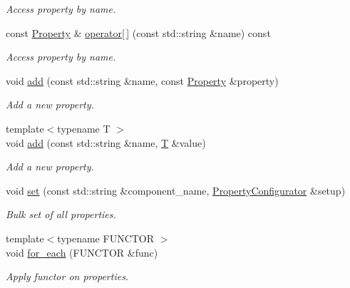 \begin{DoxyCompactItemize}
\begin{DoxyCompactList}\small\item\em Access property by name. \item\end{DoxyCompactList}\item 
const \hyperlink{class_d_d4hep_1_1_property}{Property} \& \hyperlink{class_d_d4hep_1_1_property_manager_adcb0b79db1b2b16883ad5758b5869824}{operator\mbox{[}$\,$\mbox{]}} (const std::string \&name) const 
\begin{DoxyCompactList}\small\item\em Access property by name. \item\end{DoxyCompactList}\item 
void \hyperlink{class_d_d4hep_1_1_property_manager_a616e3114076118659daddb1dc826a3ed}{add} (const std::string \&name, const \hyperlink{class_d_d4hep_1_1_property}{Property} \&property)
\begin{DoxyCompactList}\small\item\em Add a new property. \item\end{DoxyCompactList}\item 
{\footnotesize template$<$typename T $>$ }\\void \hyperlink{class_d_d4hep_1_1_property_manager_a7c6b9ce5ed0c66ff6018b3ab1aad183a}{add} (const std::string \&name, \hyperlink{class_t}{T} \&value)
\begin{DoxyCompactList}\small\item\em Add a new property. \item\end{DoxyCompactList}\item 
void \hyperlink{class_d_d4hep_1_1_property_manager_a96ebaf0f57064e8fa2f00a42c360ddf8}{set} (const std::string \&component\_\-name, \hyperlink{class_d_d4hep_1_1_property_configurator}{PropertyConfigurator} \&setup)
\begin{DoxyCompactList}\small\item\em Bulk set of all properties. \item\end{DoxyCompactList}\item 
{\footnotesize template$<$typename FUNCTOR $>$ }\\void \hyperlink{class_d_d4hep_1_1_property_manager_a2a3c9803372155eca0b28efddb2fc5b7}{for\_\-each} (FUNCTOR \&func)
\begin{DoxyCompactList}\small\item\em Apply functor on properties. \item\end{DoxyCompactList}\item 

\end{DoxyCompactItemize}
